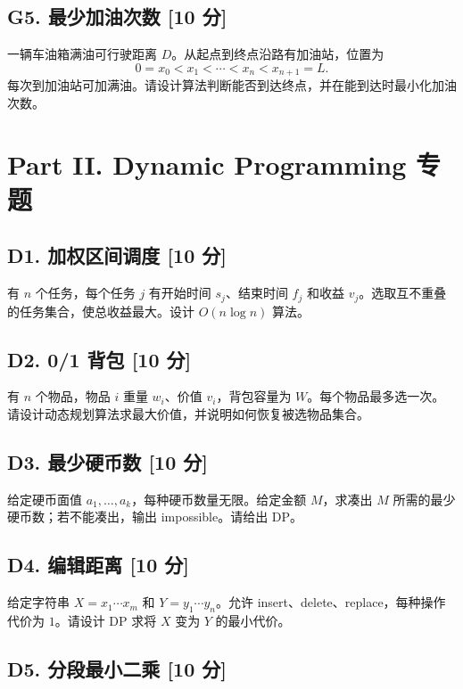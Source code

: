 \documentclass[UTF8,a4paper,11pt]{ctexart}
\newcommand{\points}[1]{\hfill{\small\textbf{[#1 分]}}}
\begin{document}
\subsection*{G5. 最少加油次数 \points{10}}

一辆车油箱满油可行驶距离 $D$。从起点到终点沿路有加油站，位置为
\[
0=x_0<x_1<\cdots<x_n<x_{n+1}=L.
\]
每次到加油站可加满油。请设计算法判断能否到达终点，并在能到达时最小化加油次数。

\newpage
\section*{Part II. Dynamic Programming 专题}

\subsection*{D1. 加权区间调度 \points{10}}

有 $n$ 个任务，每个任务 $j$ 有开始时间 $s_j$、结束时间 $f_j$ 和收益 $v_j$。选取互不重叠的任务集合，使总收益最大。设计 $O(n\log n)$ 算法。

\subsection*{D2. 0/1 背包 \points{10}}

有 $n$ 个物品，物品 $i$ 重量 $w_i$、价值 $v_i$，背包容量为 $W$。每个物品最多选一次。请设计动态规划算法求最大价值，并说明如何恢复被选物品集合。

\subsection*{D3. 最少硬币数 \points{10}}

给定硬币面值 $a_1,\ldots,a_k$，每种硬币数量无限。给定金额 $M$，求凑出 $M$ 所需的最少硬币数；若不能凑出，输出 impossible。请给出 DP。

\subsection*{D4. 编辑距离 \points{10}}

给定字符串 $X=x_1\cdots x_m$ 和 $Y=y_1\cdots y_n$。允许 insert、delete、replace，每种操作代价为 $1$。请设计 DP 求将 $X$ 变为 $Y$ 的最小代价。

\subsection*{D5. 分段最小二乘 \points{10}}
\end{document}
